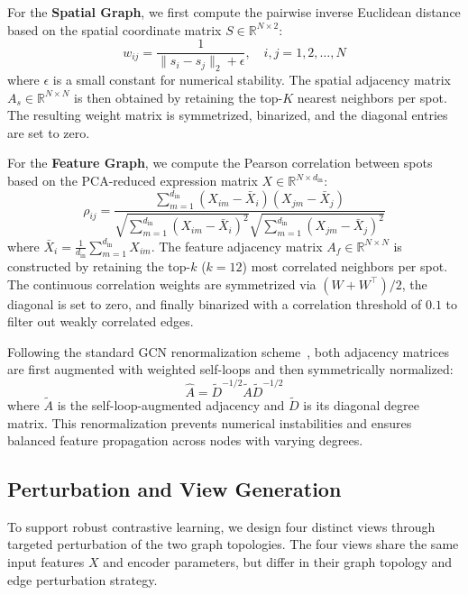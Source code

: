 \documentclass[lettersize,journal]{IEEEtran}
\begin{document}
For the \textbf{Spatial Graph}, we first compute the pairwise inverse Euclidean distance based on the spatial coordinate matrix $S \in \mathbb{R}^{N \times 2}$:
\begin{equation}
    w_{ij} = \frac{1}{\| s_i - s_j \|_2 + \epsilon}, \quad i, j = 1, 2, \dots, N
\end{equation}
where $\epsilon$ is a small constant for numerical stability. The spatial adjacency matrix $A_s \in \mathbb{R}^{N \times N}$ is then obtained by retaining the top-$K$ nearest neighbors per spot. The resulting weight matrix is symmetrized, binarized, and the diagonal entries are set to zero.

For the \textbf{Feature Graph}, we compute the Pearson correlation between spots based on the PCA-reduced expression matrix $X \in \mathbb{R}^{N \times d_{\text{in}}}$:
\begin{equation}
    \rho_{ij} = \frac{\sum_{m=1}^{d_{\text{in}}} (X_{im} - \bar{X}_i)(X_{jm} - \bar{X}_j)}{\sqrt{\sum_{m=1}^{d_{\text{in}}} (X_{im} - \bar{X}_i)^2} \sqrt{\sum_{m=1}^{d_{\text{in}}} (X_{jm} - \bar{X}_j)^2}}
\end{equation}
where $\bar{X}_i = \frac{1}{d_{\text{in}}} \sum_{m=1}^{d_{\text{in}}} X_{im}$. The feature adjacency matrix $A_f \in \mathbb{R}^{N \times N}$ is constructed by retaining the top-$k$ ($k=12$) most correlated neighbors per spot. The continuous correlation weights are symmetrized via $(W + W^\top)/2$, the diagonal is set to zero, and finally binarized with a correlation threshold of $0.1$ to filter out weakly correlated edges.

Following the standard GCN renormalization scheme~\cite{kipf2016gcn}, both adjacency matrices are first augmented with weighted self-loops and then symmetrically normalized:
\begin{equation}
    \hat{A} = \tilde{D}^{-1/2} \tilde{A} \tilde{D}^{-1/2}
\end{equation}
where $\tilde{A}$ is the self-loop-augmented adjacency and $\tilde{D}$ is its diagonal degree matrix. This renormalization prevents numerical instabilities and ensures balanced feature propagation across nodes with varying degrees.

\subsection{Perturbation and View Generation}
\label{sec:perturbation}
To support robust contrastive learning, we design four distinct views through targeted perturbation of the two graph topologies. The four views share the same input features $X$ and encoder parameters, but differ in their graph topology and edge perturbation strategy.
\end{document}
